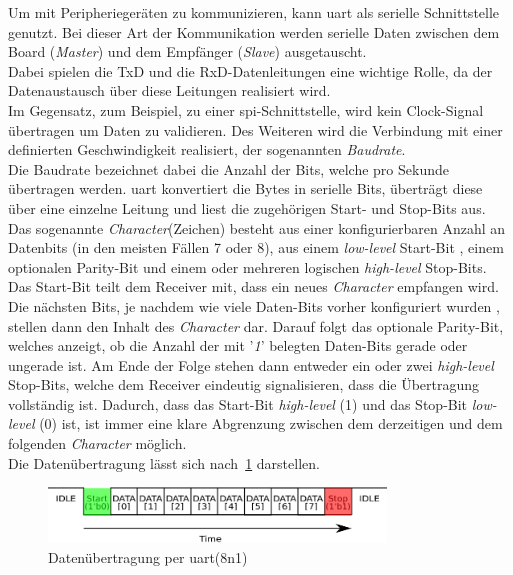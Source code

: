 Um mit Peripheriegeräten zu kommunizieren, kann \ac{uart} als serielle Schnittstelle genutzt.
Bei dieser Art der Kommunikation werden serielle Daten zwischen dem Board (\emph{Master})
und dem Empfänger (\emph{Slave}) ausgetauscht. \\
Dabei spielen die TxD und die RxD-Datenleitungen
eine wichtige Rolle, da der Datenaustausch über diese Leitungen realisiert wird.\\
Im Gegensatz, zum Beispiel, zu einer \ac{spi}-Schnittstelle, wird kein Clock-Signal
übertragen um Daten zu validieren. Des Weiteren wird die Verbindung mit einer definierten
Geschwindigkeit realisiert, der sogenannten \emph{Baudrate}. \cite{uartpdf} \\
Die Baudrate bezeichnet dabei die Anzahl der Bits, welche pro Sekunde übertragen werden.
\ac{uart} konvertiert die Bytes in serielle Bits, überträgt diese über eine einzelne Leitung
und liest die zugehörigen Start- und Stop-Bits aus.\\
Das sogenannte \emph{Character}(Zeichen) besteht aus einer konfigurierbaren Anzahl an Datenbits (in den meisten
Fällen 7 oder 8), aus einem \emph{low-level} Start-Bit , einem optionalen Parity-Bit und einem
oder mehreren logischen \emph{high-level} Stop-Bits.\\
Das Start-Bit teilt dem Receiver mit, dass ein neues \emph{Character} empfangen wird.
Die nächsten Bits, je nachdem wie viele Daten-Bits vorher konfiguriert wurden , stellen
dann den Inhalt des \emph{Character} dar. Darauf folgt das optionale Parity-Bit,
welches anzeigt, ob die Anzahl der mit '\emph{1}' belegten Daten-Bits gerade oder
ungerade ist. Am Ende der Folge stehen dann entweder ein oder zwei  \emph{high-level } Stop-Bits,
welche dem Receiver eindeutig signalisieren, dass die Übertragung vollständig ist. Dadurch,
dass das Start-Bit \emph{high-level} (1) und das Stop-Bit \emph{low-level} (0) ist,
ist immer eine klare Abgrenzung zwischen dem derzeitigen und dem folgenden \emph{Character} möglich.\\

Die Datenübertragung lässt sich nach~\ref{fig:uart} darstellen.\\

\begin{figure}[h!]
\centering
\includegraphics[width=0.8\textwidth]{Hauptteil/uart.eps}
\caption{Datenübertragung per \ac{uart}(8n1) }
\label{fig:uart}
\end{figure}


